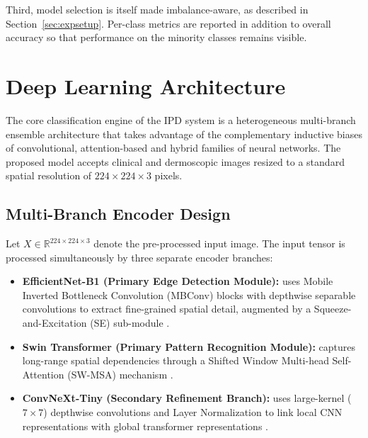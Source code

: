 \documentclass[pdflatex,sn-mathphys-num]{sn-jnl}%
\begin{document}
Third, model selection is itself made imbalance-aware, as described in
Section~\ref{sec:expsetup}. Per-class metrics are reported in addition to overall accuracy so
that performance on the minority classes remains visible.

\section{Deep Learning Architecture}\label{sec:dlarch}

The core classification engine of the IPD system is a heterogeneous multi-branch ensemble
architecture that takes advantage of the complementary inductive biases of convolutional,
attention-based and hybrid families of neural networks. The proposed model accepts clinical
and dermoscopic images resized to a standard spatial resolution of $224 \times 224 \times 3$
pixels.

\subsection{Multi-Branch Encoder Design}\label{sec:encoder}

Let $X \in \mathbb{R}^{224 \times 224 \times 3}$ denote the pre-processed input image. The
input tensor is processed simultaneously by three separate encoder branches:

\begin{itemize}
\item \textbf{EfficientNet-B1 (Primary Edge Detection Module):} uses Mobile Inverted
Bottleneck Convolution (MBConv) blocks with depthwise separable convolutions to extract
fine-grained spatial detail, augmented by a Squeeze-and-Excitation (SE) sub-module
\cite{ref27}.
\item \textbf{Swin Transformer (Primary Pattern Recognition Module):} captures long-range
spatial dependencies through a Shifted Window Multi-head Self-Attention (SW-MSA) mechanism
\cite{ref11}.
\item \textbf{ConvNeXt-Tiny (Secondary Refinement Branch):} uses large-kernel ($7 \times 7$)
depthwise convolutions and Layer Normalization to link local CNN representations with global
transformer representations \cite{ref12}.
\end{itemize}
\end{document}

